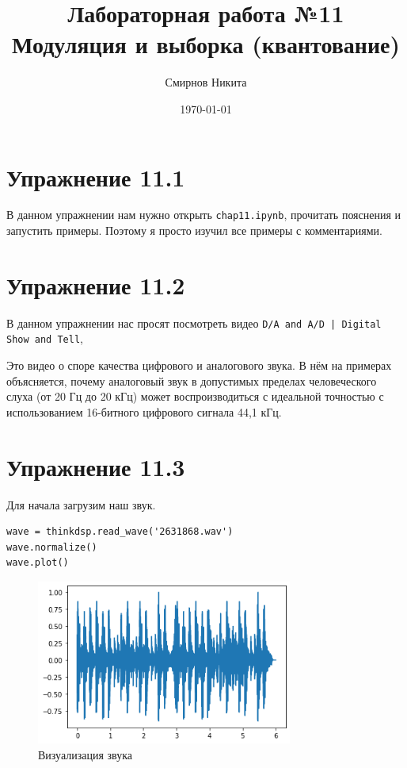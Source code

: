 \documentclass[a4paper,12pt]{report}
\title{Лабораторная работа №11\\Модуляция и выборка (квантование)}
\author{Смирнов Никита}
\date{\today}
\begin{document}
\maketitle
\tableofcontents
\listoffigures
\lstlistoflistings

\maketitle

\chapter{Упражнение 11.1}

В данном упражнении нам нужно открыть \texttt{chap11.ipynb}, прочитать пояснения и  запустить примеры. Поэтому я просто изучил все примеры с комментариями. 

\chapter{Упражнение 11.2}

В данном упражнении нас просят посмотреть видео \texttt{D/A and A/D | Digital Show and Tell}, 

Это видео о споре качества цифрового и аналогового звука. В нём на примерах объясняется, почему аналоговый звук в допустимых пределах человеческого слуха (от 20 Гц до 20 кГц) может воспроизводиться с идеальной точностью с использованием 16-битного цифрового сигнала 44,1 кГц.

\chapter{Упражнение 11.3}

Для начала загрузим наш звук.

\begin{lstlisting}[caption=Загрузка звука]
wave = thinkdsp.read_wave('2631868.wav')
wave.normalize()
wave.plot()
\end{lstlisting}

\begin{figure}[H]
        \centering
        \includegraphics[width=0.75\textwidth]{1.png}
        \caption{Визуализация звука}
        \label{1}
\end{figure}
\end{document}
